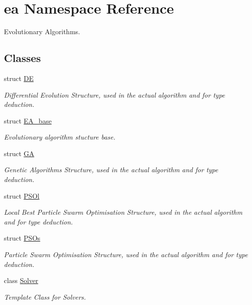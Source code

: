 \hypertarget{namespaceea}{}\section{ea Namespace Reference}
\label{namespaceea}


Evolutionary Algorithms.  


\subsection*{Classes}
\begin{DoxyCompactItemize}
\item 
struct \hyperlink{structea_1_1_d_e}{DE}
\begin{DoxyCompactList}\small\item\em Differential Evolution Structure, used in the actual algorithm and for type deduction. \end{DoxyCompactList}\item 
struct \hyperlink{structea_1_1_e_a__base}{E\+A\+\_\+base}
\begin{DoxyCompactList}\small\item\em Evolutionary algorithm stucture base. \end{DoxyCompactList}\item 
struct \hyperlink{structea_1_1_g_a}{GA}
\begin{DoxyCompactList}\small\item\em Genetic Algorithms Structure, used in the actual algorithm and for type deduction. \end{DoxyCompactList}\item 
struct \hyperlink{structea_1_1_p_s_ol}{P\+S\+Ol}
\begin{DoxyCompactList}\small\item\em Local Best Particle Swarm Optimisation Structure, used in the actual algorithm and for type deduction. \end{DoxyCompactList}\item 
struct \hyperlink{structea_1_1_p_s_os}{P\+S\+Os}
\begin{DoxyCompactList}\small\item\em Particle Swarm Optimisation Structure, used in the actual algorithm and for type deduction. \end{DoxyCompactList}\item 
class \hyperlink{classea_1_1_solver}{Solver}
\begin{DoxyCompactList}\small\item\em Template Class for Solvers. \end{DoxyCompactList}\item 

\end{DoxyCompactItemize}
